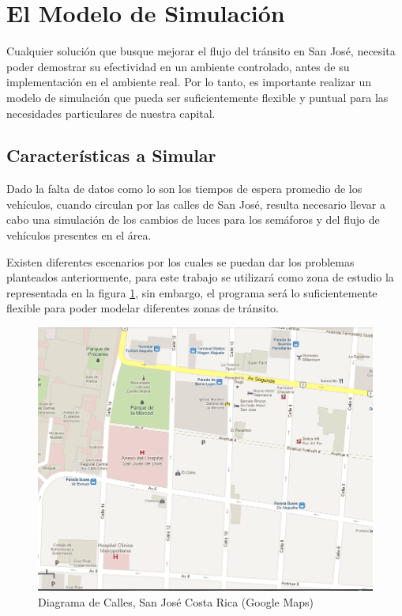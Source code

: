 \documentclass[conference]{IEEEtran}
\begin{document}
\section{El Modelo de Simulaci\'{o}n}
Cualquier soluci\'on que busque mejorar el flujo del tr\'ansito en San Jos\'e, necesita poder demostrar su efectividad en un ambiente controlado, antes de su implementaci\'on en el ambiente real. Por lo tanto, es importante realizar un modelo de simulaci\'{o}n que pueda ser suficientemente flexible y puntual para las necesidades particulares de nuestra capital.

\subsection{Caracter\'{i}sticas a Simular}
Dado la falta de datos como lo son los tiempos de espera promedio de los veh\'{i}culos, cuando circulan por las calles de San Jos\'{e}, resulta necesario llevar a cabo una simulaci\'{o}n de los cambios de luces para los sem\'{a}foros y del flujo de veh\'{i}culos presentes en el \'{a}rea. 

Existen diferentes escenarios por los cuales se puedan dar los problemas planteados anteriormente, para este trabajo se utilizar\'{a} como zona de estudio la representada en la figura \ref{fig:traficoSJ}, sin embargo, el programa ser\'a lo suficientemente flexible para poder modelar diferentes zonas de tr\'ansito.
	
	\begin{figure}[htp]
\centering
\includegraphics[scale=0.37]{images/trafico1.png}
\caption{Diagrama de Calles, San Jos\'e Costa Rica (Google Maps)}
\label{fig:traficoSJ}
\end{figure}
\end{document}
